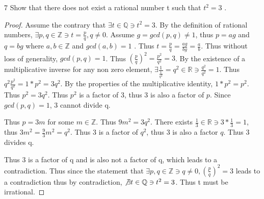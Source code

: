 \documentclass{article}
\newcommand{\R}{\mathbb{R}}
\newcommand{\Q}{\mathbb{Q}}
\newcommand{\Z}{\mathbb{Z}}
\begin{document}
\bigskip

\begin{PROB}{7}\label{Problem 7.}
    Show that there does not exist a rational number t such that $t^2 = 3$ .
\end{PROB}
\begin{proof}
    Assume the contrary that $\exists t \in \Q \ni t^2 = 3$. By the definition of rational numbers, $\exists p, q \in \Z \ni t = \frac{p}{q}, q \neq 0$. Assume $g = gcd(p, q) \neq 1$, thus $p = ag$ and $q = bg$ where $a, b \in \Z$ and $gcd(a, b) = 1$ . Thus $t = \frac{p}{q} = \frac{ag}{bg} = \frac{a}{b}$. Thus without loss of generality, $gcd(p, q) = 1$. Thus $(\frac{p}{q})^2 = \frac{p^2}{q^2} = 3$. By the existence of a multiplicative inverse for any non zero element, $\exists \frac{1}{\frac{1}{q^2}} = q^2 \in \R \ni \frac{q^2}{q^2} = 1$. Thus $q^2 \frac{p^2}{q^2} = 1 * p^2 = 3q^2$. By the properties of the multiplicative identity, $1*p^2 = p^2$. Thus $p^2 = 3q^2$. Thus $p^2$ is a factor of 3, thus 3 is also a factor of $p$. Since $gcd(p, q) = 1$, 3 cannot divide q.  
    
    
    Thus $p = 3m $ for some $m \in \Z$. Thus $9m^2 = 3q^2$. There exists $\frac{1}{3} \in \R \ni 3 * \frac{1}{3} = 1$, thus $3m^2 = \frac{9}{3}m^2 = q^2$. Thus $3$ is a factor of $q^2$, thus 3 is also a factor $q$. Thus 3 divides q. 

    Thus 3 is a factor of q and is also not a factor of q, which leads to a contradiction. Thus since the statement that $\exists p, q \in \Z \ni q \neq 0, (\frac{p}{q})^2 = 3$ leads to a contradiction thus by contradiction, $\not \exists t \in \Q \ni t^2 = 3$. Thus t must be irrational.    
\end{proof}
\end{document}
